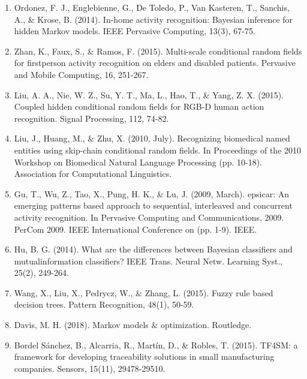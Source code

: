 \documentclass[10pt]{article}
\begin{document}
\begin{enumerate}
  \item Ordonez, F. J., Englebienne, G., De Toledo, P., Van Kasteren, T., Sanchis, A., \& Krose, B. (2014). In-home activity recognition: Bayesian inference for hidden Markov models. IEEE Pervasive Computing, 13(3), 67-75.

  \item Zhan, K., Faux, S., \& Ramos, F. (2015). Multi-scale conditional random fields for firstperson activity recognition on elders and disabled patients. Pervasive and Mobile Computing, 16, 251-267.

  \item Liu, A. A., Nie, W. Z., Su, Y. T., Ma, L., Hao, T., \& Yang, Z. X. (2015). Coupled hidden conditional random fields for RGB-D human action recognition. Signal Processing, 112, 74-82.

  \item Liu, J., Huang, M., \& Zhu, X. (2010, July). Recognizing biomedical named entities using skip-chain conditional random fields. In Proceedings of the 2010 Workshop on Biomedical Natural Language Processing (pp. 10-18). Association for Computational Linguistics.

  \item Gu, T., Wu, Z., Tao, X., Pung, H. K., \& Lu, J. (2009, March). epsicar: An emerging patterns based approach to sequential, interleaved and concurrent activity recognition. In Pervasive Computing and Communications, 2009. PerCom 2009. IEEE International Conference on (pp. 1-9). IEEE.

  \item Hu, B. G. (2014). What are the differences between Bayesian classifiers and mutualinformation classifiers? IEEE Trans. Neural Netw. Learning Syst., 25(2), 249-264.

  \item Wang, X., Liu, X., Pedrycz, W., \& Zhang, L. (2015). Fuzzy rule based decision trees. Pattern Recognition, 48(1), 50-59.

  \item Davis, M. H. (2018). Markov models \& optimization. Routledge.

  \item Bordel Sánchez, B., Alcarria, R., Martín, D., \& Robles, T. (2015). TF4SM: a framework for developing traceability solutions in small manufacturing companies. Sensors, 15(11), 29478-29510.

\end{enumerate}
\end{document}
